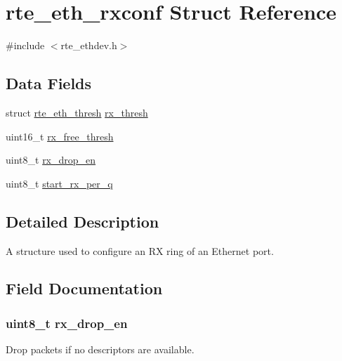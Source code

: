 \hypertarget{structrte__eth__rxconf}{}\section{rte\+\_\+eth\+\_\+rxconf Struct Reference}
\label{structrte__eth__rxconf}


{\ttfamily \#include $<$rte\+\_\+ethdev.\+h$>$}

\subsection*{Data Fields}
\begin{DoxyCompactItemize}
\item 
struct \hyperlink{structrte__eth__thresh}{rte\+\_\+eth\+\_\+thresh} \hyperlink{structrte__eth__rxconf_a54f23ee5a28d183c8d6760f80944f2a2}{rx\+\_\+thresh}
\item 
uint16\+\_\+t \hyperlink{structrte__eth__rxconf_afb96f8601653c049cf230aee1cc6a5ce}{rx\+\_\+free\+\_\+thresh}
\item 
uint8\+\_\+t \hyperlink{structrte__eth__rxconf_aaccf5b8238b9207f8102d69959ac3391}{rx\+\_\+drop\+\_\+en}
\item 
uint8\+\_\+t \hyperlink{structrte__eth__rxconf_a8f2a0aa8ea1c433bdf44d467af90582f}{start\+\_\+rx\+\_\+per\+\_\+q}
\end{DoxyCompactItemize}


\subsection{Detailed Description}
A structure used to configure an R\+X ring of an Ethernet port. 

\subsection{Field Documentation}
\hypertarget{structrte__eth__rxconf_aaccf5b8238b9207f8102d69959ac3391}{}
\subsubsection[{rx\+\_\+drop\+\_\+en}]{\setlength{\rightskip}{0pt plus 5cm}uint8\+\_\+t rx\+\_\+drop\+\_\+en}\label{structrte__eth__rxconf_aaccf5b8238b9207f8102d69959ac3391}
Drop packets if no descriptors are available. \hypertarget{structrte__eth__rxconf_afb96f8601653c049cf230aee1cc6a5ce}{}
